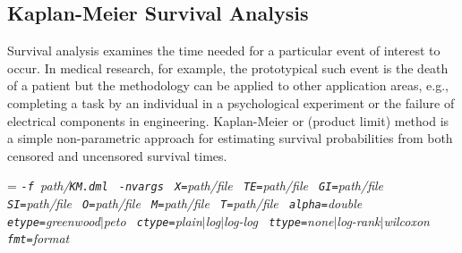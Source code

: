 \begin{comment}

 Licensed to the Apache Software Foundation (ASF) under one
 or more contributor license agreements.  See the NOTICE file
 distributed with this work for additional information
 regarding copyright ownership.  The ASF licenses this file
 to you under the Apache License, Version 2.0 (the
 "License"); you may not use this file except in compliance
 with the License.  You may obtain a copy of the License at

   http://www.apache.org/licenses/LICENSE-2.0

 Unless required by applicable law or agreed to in writing,
 software distributed under the License is distributed on an
 "AS IS" BASIS, WITHOUT WARRANTIES OR CONDITIONS OF ANY
 KIND, either express or implied.  See the License for the
 specific language governing permissions and limitations
 under the License.

\end{comment}

\subsection{Kaplan-Meier Survival Analysis}
\label{sec:kaplan-meier}

\smallskip


Survival analysis examines the time needed for a particular event of interest to occur.
In medical research, for example, the prototypical such event is the death of a patient but the methodology can be applied to other application areas, e.g., completing a task by an individual in a psychological experiment or the failure of electrical components in engineering.   
Kaplan-Meier or (product limit) method is a simple non-parametric approach for estimating survival probabilities from both censored and uncensored survival times.\\

 

\smallskip
{}
\smallskip

{\hangindent=\parindent\noindent\it%
{\tt{}-f }path/\/{\tt{}KM.dml}
{\tt{} -nvargs}
{\tt{} X=}path/file
{\tt{} TE=}path/file
{\tt{} GI=}path/file
{\tt{} SI=}path/file
{\tt{} O=}path/file
{\tt{} M=}path/file
{\tt{} T=}path/file
{\tt{} alpha=}double
{\tt{} etype=}greenwood$\mid$peto
{\tt{} ctype=}plain$\mid$log$\mid$log-log
{\tt{} ttype=}none$\mid$log-rank$\mid$wilcoxon
{\tt{} fmt=}format

}

